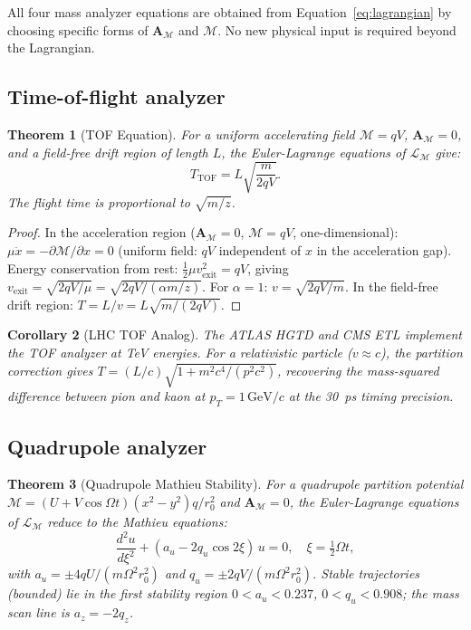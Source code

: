 \documentclass[twocolumn,10pt,a4paper]{article}
\theoremstyle{thmstyle}
\newtheorem{theorem}{Theorem}[section]
\newtheorem{corollary}[theorem]{Corollary}
\theoremstyle{definition}
\theoremstyle{remark}
\newcommand{\LM}{\mathcal{L}_{\mathcal{M}}}
\newcommand{\AM}{\mathbf{A}_{\mathcal{M}}}
\newcommand{\Mop}{\mathcal{M}}
\begin{document}
All four mass analyzer equations are obtained from
Equation~\eqref{eq:lagrangian} by choosing specific forms of $\AM$ and
$\Mop$. No new physical input is required beyond the Lagrangian.

\subsection{Time-of-flight analyzer}

\begin{theorem}[TOF Equation]
\label{thm:tof}
For a uniform accelerating field $\Mop = qV$, $\AM = 0$, and a field-free
drift region of length $L$, the Euler-Lagrange equations of $\LM$ give:
\begin{equation}
T_{\mathrm{TOF}} = L\sqrt{\frac{m}{2qV}}.
\label{eq:tof}
\end{equation}
The flight time is proportional to $\sqrt{m/z}$.
\end{theorem}

\begin{proof}
In the acceleration region ($\AM = 0$, $\Mop = qV$, one-dimensional):
$\mu\ddot{x} = -\partial\Mop/\partial x = 0$ (uniform field: $qV$ independent
of $x$ in the acceleration gap). Energy conservation from rest:
$\tfrac{1}{2}\mu v_{\mathrm{exit}}^2 = qV$, giving
$v_{\mathrm{exit}} = \sqrt{2qV/\mu} = \sqrt{2qV/(\alpha m/z)}$.
For $\alpha = 1$: $v = \sqrt{2qV/m}$.
In the field-free drift region: $T = L/v = L\sqrt{m/(2qV)}$.
\end{proof}

\begin{corollary}[LHC TOF Analog]
The ATLAS HGTD and CMS ETL implement the TOF analyzer at TeV energies.
For a relativistic particle ($v \approx c$), the partition correction gives
$T = (L/c)\sqrt{1 + m^2c^4/(p^2c^2)}$, recovering the mass-squared
difference between pion and kaon at $p_T = 1\,\mathrm{GeV}/c$
at the 30~ps timing precision.
\end{corollary}

\subsection{Quadrupole analyzer}

\begin{theorem}[Quadrupole Mathieu Stability]
\label{thm:quad}
For a quadrupole partition potential
$\Mop = (U + V\cos\Omega t)(x^2 - y^2)q/r_0^2$
and $\AM = 0$, the Euler-Lagrange equations of $\LM$ reduce to the
Mathieu equations:
\begin{equation}
\frac{d^2u}{d\xi^2} + (a_u - 2q_u\cos 2\xi)\,u = 0,
\quad \xi = \tfrac{1}{2}\Omega t,
\label{eq:mathieu}
\end{equation}
with $a_u = \pm 4qU/(m\Omega^2 r_0^2)$ and
$q_u = \pm 2qV/(m\Omega^2 r_0^2)$.
Stable trajectories (bounded) lie in the first stability region
$0 < a_u < 0.237$, $0 < q_u < 0.908$; the mass scan line is $a_z = -2q_z$.
\end{theorem}
\end{document}
